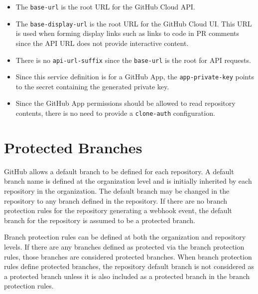 \begin{itemize}
    \item The \texttt{base-url} is the root URL for the GitHub Cloud API.
    \item The \texttt{base-display-url} is the root URL for the GitHub Cloud UI. This URL is used
    when forming display links such as links to code in PR comments since the API URL does not
    provide interactive content.
    \item There is no \texttt{api-url-suffix} since the \texttt{base-url} is the root for API requests.
    \item Since this service definition is for a GitHub App, the \texttt{app-private-key} points to the secret
    containing the generated private key.
    \item Since the GitHub App permissions should be allowed to read repository contents, there is no need
    to provide a \texttt{clone-auth} configuration.
\end{itemize}



\section{Protected Branches}

GitHub allows a default branch to be defined for each repository.  A default branch name is defined at the organization
level and is initially inherited by each repository in the organization.  The default branch may be changed in the repository
to any branch defined in the repository. If there are no branch protection rules for the repository generating a webhook event, 
the default branch for the repository is assumed to be a protected branch.

Branch protection rules can be defined at both the organization and repository levels.  If there are any branches
defined as protected via the branch protection rules, those branches are considered protected branches.  When branch protection
rules define protected branches, the repository default branch is not considered as a protected branch unless it is also included
as a protected branch in the branch protection rules.
